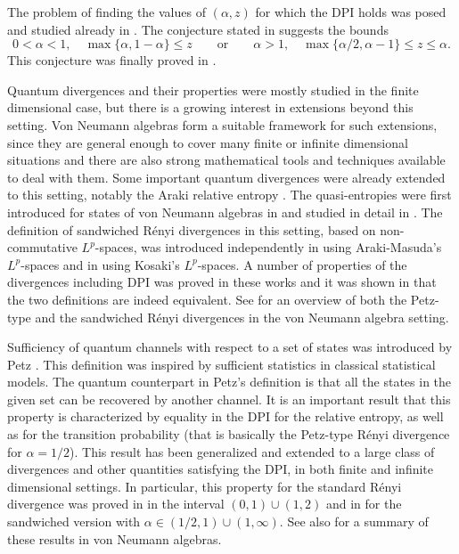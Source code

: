 \documentclass[12pt]{article}
\theoremstyle{definition}
\theoremstyle{remark}
\numberwithin{equation}{section}
\begin{document}
The problem of finding the values of $(\alpha,z)$ for which the DPI holds was posed and studied
already in \cite{audenaert2015alpha}. The conjecture stated in
\cite{carlen2018inequalities} suggests the bounds
\[
0<\alpha<1, \quad \max\{\alpha,1-\alpha\}\le z\qquad \text{or}\qquad \alpha>1,\quad
\max\{{\alpha/2},\alpha-1\}\le z\le \alpha.
\]
This conjecture was finally proved in \cite{zhang2020fromwyd}.


Quantum divergences and their properties were mostly studied in the finite dimensional
case, but there is a growing interest in extensions beyond this setting. Von Neumann
algebras form a suitable framework for such extensions, since they are general enough to
cover many finite or infinite dimensional situations and there are also strong mathematical
tools and techniques available to deal with them. Some important quantum divergences were
already extended to this setting, notably the Araki relative entropy \cite{araki1976relative}. The
quasi-entropies were first introduced for states of von Neumann algebras in
\cite{petz1985quasi} and studied in detail in \cite{hiai2018quantum}. The definition of sandwiched
R\'enyi divergences in this setting, based on non-commutative $L^p$-spaces,  was
introduced independently in \cite{berta2018renyi}  using Araki-Masuda's $L^p$-spaces and
in \cite{jencova2018renyi,jencova2021renyi} using Kosaki's $L^p$-spaces. A number of
properties of the divergences including DPI was proved in these works and it was shown in
\cite{jencova2018renyi} that the two definitions are indeed equivalent. See \cite{hiai2021quantum} for
an overview of both the Petz-type and the sandwiched R\'enyi divergences in the
von Neumann algebra setting.

Sufficiency of quantum channels with respect to a set of states was introduced by Petz
\cite{petz1986sufficient,petz1988sufficiency}. This definition was inspired by sufficient statistics 
{in} classical statistical models. The quantum counterpart in Petz's definition is that all
the states in the given set can be recovered by another channel. It is an important result
that this property is characterized by equality in the DPI for the relative entropy, as well
as for the transition probability (that is basically the Petz-type R\'enyi divergence for
$\alpha=1/2$). This result has been generalized and extended to a large class of
divergences and other quantities satisfying the DPI, in both finite and infinite
dimensional settings. In particular, this property 
for the standard R\'enyi divergence was proved in \cite{hiai2017different} in the interval $(0,1)\cup(1,2)$
and in \cite{jencova2017preservation, jencova2018renyi, jencova2021renyi} for the sandwiched version
with $\alpha\in(1/2,1)\cup(1,\infty)$. See also \cite{hiai2021quantum} for a summary of these results
in von Neumann algebras.  
\end{document}
